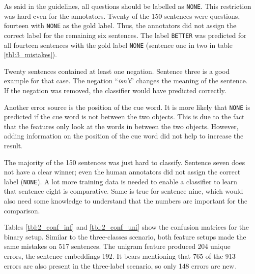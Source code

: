 As said in the guidelines, all questions should be labelled as \texttt{NONE}. This restriction was hard even for the annotators. Twenty of the 150 sentences were questions, fourteen with \texttt{NONE} as the gold label. Thus, the annotators did not assign the correct label for the remaining six sentences. The label \texttt{BETTER} was predicted for all fourteen sentences with the gold label \texttt{NONE} (sentence one in two in table  \ref{tbl:3_mistakes}).

Twenty sentences contained at least one negation. Sentence three  is a good example for that case. The negation \enquote{\emph{isn't}} changes the meaning of the sentence. If the negation was removed, the classifier would have predicted correctly.


Another error source is the position of the cue word. It is more likely that \texttt{NONE} is predicted if the cue word is not between the two objects. This is due to the fact that the features only look at the words in between the two objects. However, adding information on the position of the cue word did not help to increase the result. %

The majority of the 150 sentences was just hard to classify. Sentence seven does not have a clear winner; even the human annotators did not assign the correct label (\texttt{NONE}). A lot more training data is needed to enable a classifier to learn that sentence eight is comparative. Same is true for sentence nine, which would also need some knowledge to understand that the numbers are important for the comparison.\newline \newline 



Tables \ref{tbl:2_conf_inf} and \ref{tbl:2_conf_uni} show the confusion matrices for the binary setup. Similar to the three-classes scenario, both feature setups made the same mistakes on 517 sentences. The unigram feature produced 204 unique errors, the sentence embeddings 192. It bears mentioning that 765 of the 913 errors are also present in the three-label scenario, so only 148 errors are new. 

